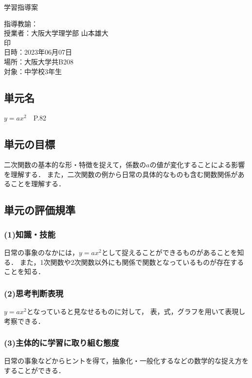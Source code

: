 \documentclass{ltjsarticle}
\begin{document}
\begin{center}
  \Large{学習指導案}
\end{center}
\hfill 指導教諭：\\
\hfill 授業者：大阪大学理学部 山本雄大\\
\hfill 印\\
日時：2023年06月07日\\
場所：大阪大学共B208\\
対象：中学校3年生\\
\subsection{単元名}\vspace*{-3mm}
  \(y=ax^2\)\ \ P.82
  \vspace*{-3mm}
\subsection{単元の目標}\vspace*{-3mm}
  二次関数の基本的な形・特徴を捉えて，係数の\(a\)の値が変化することによる影響を理解する．
  また，二次関数の例から日常の具体的なものも含む関数関係があることを理解する．
  \vspace*{-3mm}
\subsection{単元の評価規準}\vspace*{-3mm}
\subsubsection*{(1)知識・技能}
  日常の事象のなかには，\(y=ax^2\)として捉えることができるものがあることを知る．
  また，1次関数や2次関数以外にも関係で関数となっているものが存在することを知る．
  \vspace*{-3mm}
\subsubsection*{(2)思考判断表現}
  \(y=ax^2\)となっていると見なせるものに対して，
  表，式，グラフを用いて表現し考察できる．
  \vspace*{-3mm}
\subsubsection*{(3)主体的に学習に取り組む態度}
  日常の事象などからヒントを得て，抽象化・一般化するなどの数学的な捉え方をすることができる．
  \vspace*{-3mm}
\end{document}
